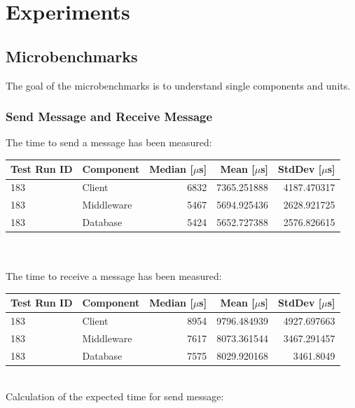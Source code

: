 \documentclass[milestone1.tex]{subfiles}
\begin{document}
\section{Experiments}


\subsection{Microbenchmarks}

The goal of the microbenchmarks is to understand single components and units.

\subsubsection{Send Message and Receive Message}

The time to send a message has been measured:\\

\begin{tabular}{|l|l|r|r|r|}
\hline 
Test Run ID & Component & Median [$\mu$s] & Mean [$\mu$s] & StdDev [$\mu$s] \\ \hline
183 & Client & 6832 & 7365.251888 & 4187.470317 \\ \hline
183 & Middleware & 5467 & 5694.925436 & 2628.921725 \\ \hline
183 & Database & 5424 & 5652.727388 & 2576.826615 \\ \hline
\end{tabular}
\\\\

\noindent The time to receive a message has been measured:\\

\begin{tabular}{|l|l|r|r|r|}
\hline 
Test Run ID & Component & \textbf{Median [$\mu$s]} & Mean [$\mu$s] & StdDev [$\mu$s] \\ \hline
183 & Client & 8954 & 9796.484939 & 4927.697663 \\ \hline
183 & Middleware & 7617 & 8073.361544 & 3467.291457 \\ \hline
183 & Database & 7575 & 8029.920168 & 3461.8049 \\ \hline
\end{tabular}
\\

\noindent Calculation of the expected time for send message:
\end{document}

